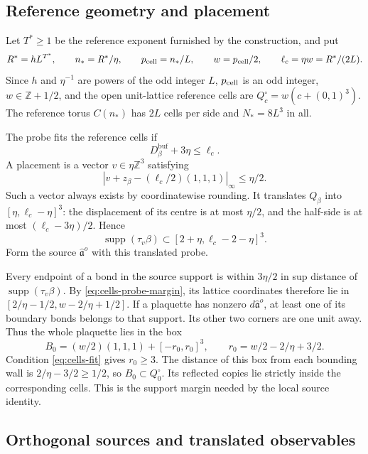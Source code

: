 \documentclass[11pt,letterpaper,reqno]{amsart}
\newcommand{\Z}{\mathbb Z}
\DeclareMathOperator{\supp}{supp}
\begin{document}
\subsection{Reference geometry and placement}

Let $T^*\ge1$ be the reference exponent furnished by the
construction, and put
\[
 R^*=hL^{T^*},\qquad n_*=R^*/\eta,\qquad
 p_{\rm cell}=n_*/L,\qquad w=p_{\rm cell}/2,\qquad \ell_c=\eta w=R^*/(2L).
\]
Since $h$ and $\eta^{-1}$ are powers of the odd integer $L$,
$p_{\rm cell}$ is an odd integer, $w\in\Z+1/2$, and the open unit-lattice
reference cells are $Q_c^\circ=w(c+(0,1)^3)$.
The reference torus $C(n_*)$ has $2L$ cells per side and
$N_*=8L^3$ in all.

The probe fits the reference cells if
\begin{equation}\label{eq:cells-fit}
 D_\beta^{\mathrm{buf}}+3\eta\le\ell_c.
\end{equation}
A placement is a vector $v\in\eta\Z^3$ satisfying
\[
 |v+z_\beta-(\ell_c/2)(1,1,1)|_\infty\le\eta/2.
\]
Such a vector always exists by coordinatewise rounding.
It translates $Q_\beta$ into $[\eta,\ell_c-\eta]^3$:
the displacement of its centre is at most $\eta/2$, and
the half-side is at most $(\ell_c-3\eta)/2$.
Hence
\begin{equation}\label{eq:cells-probe-margin}
 \supp(\tau_v\beta)
                     \subset[2+\eta,\ell_c-2-\eta]^3.
\end{equation}
Form the source $\hat{\mathfrak a}^o$ with this translated
probe.

Every endpoint of a bond in the source support is within
$3\eta/2$ in sup distance of $\supp(\tau_v\beta)$.
By \eqref{eq:cells-probe-margin}, its lattice coordinates
therefore lie in
$[2/\eta-1/2,w-2/\eta+1/2]$.
If a plaquette has nonzero $d\hat{\mathfrak a}^o$, at least
one of its boundary bonds belongs to that support. Its
other two corners are one unit away. Thus the whole
plaquette lies in the box
\begin{equation}\label{eq:cells-support-box}
 B_0=(w/2)(1,1,1)+[-r_0,r_0]^3,\qquad
 r_0=w/2-2/\eta+3/2.
\end{equation}
Condition \eqref{eq:cells-fit} gives $r_0\ge3$.
The distance of this box from each bounding wall is
$2/\eta-3/2\ge1/2$, so $B_0\subset Q_0^\circ$.
Its reflected copies lie strictly inside the corresponding
cells. This is the support margin needed by the local
source identity.

\subsection{Orthogonal sources and translated observables}
\end{document}
